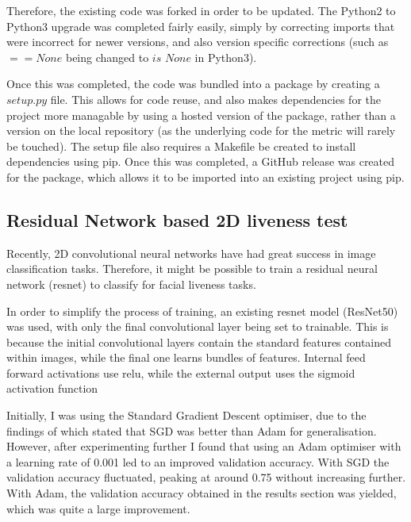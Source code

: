 \documentclass[10pt,a4paper]{article}
\begin{document}
        Therefore, the existing code was forked in order to be updated. The Python2 to Python3 upgrade was completed fairly easily, simply by correcting imports that were incorrect
        for newer versions, and also version specific corrections (such as $== None$ being changed to $is$ $None$ in Python3).
        
        Once this was completed, the code was bundled into a package by creating a $setup.py$ file. This allows for code reuse, and also makes dependencies for the project
        more managable by using a hosted version of the package, rather than a version on the local repository (as the underlying code for the metric will rarely be touched).
        The setup file also requires a Makefile be created to install dependencies using pip. Once this was completed, a GitHub release was created for the package, which allows it to be
        imported into an existing project using pip. \cite{VideoQualityUpdated}


    \subsection{Residual Network based 2D liveness test}
        Recently, 2D convolutional neural networks have had great success in image classification tasks. Therefore, it might be possible to train
        a residual neural network (resnet) to classify for facial liveness tasks.

        In order to simplify the process of training, an existing resnet model (ResNet50) was used, with only the final convolutional layer being
        set to trainable. This is because the initial convolutional layers contain the standard features contained within images, while the final one
        learns bundles of features. Internal feed forward activations use relu, while the external output uses the sigmoid activation function

        Initially, I was using the Standard Gradient Descent optimiser, due to the findings of \cite{SGDBetterThanAdamForImageClassification} which stated
        that SGD was better than Adam for generalisation. However, after experimenting further I found that using an Adam optimiser with a learning rate of 0.001
        led to an improved validation accuracy. With SGD the validation accuracy fluctuated, peaking at around 0.75 without increasing further. With Adam, the
        validation accuracy obtained in the results section was yielded, which was quite a large improvement.
\end{document}
